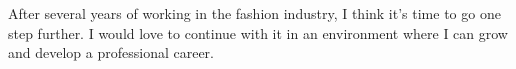 

\begin{cvparagraph}

After several years of working in the fashion industry, I think it's time to go one step further. I would love to continue with it in an environment where I can grow and develop a professional career.
\end{cvparagraph}
